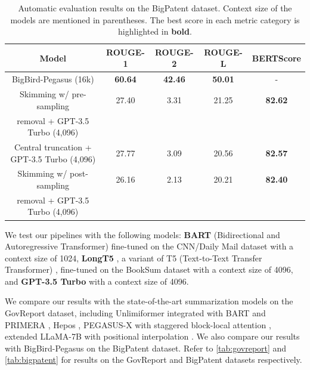 	\begin{table}[!ht]
		\centering

		\begin{tabular}{c c c c c}
			\hline
			Model & ROUGE-1 & ROUGE-2 & ROUGE-L & BERTScore \\
			\hline
			BigBird-Pegasus (16k) & \textbf{60.64} & \textbf{42.46} & \textbf{50.01} & - \\
			\hline
			Skimming w/ pre-sampling & 27.40 & 3.31 & 21.25 & \textbf{82.62} \\
			removal + GPT-3.5 Turbo (4,096) & & & & \\
			Central truncation + GPT-3.5 Turbo (4,096) & 27.77 & 3.09 & 20.56 & \textbf{82.57} \\
			Skimming w/ post-sampling & 26.16 & 2.13 & 20.21 & \textbf{82.40} \\
			removal + GPT-3.5 Turbo (4,096) & & & & \\
			\hline
		\end{tabular}

		\caption{Automatic evaluation results on the BigPatent dataset. Context size of the models are
		mentioned in parentheses. The best score in each metric category is highlighted in \textbf{bold}.}
		\label{tab:bigpatent}
	\end{table}

	We test our pipelines with the following models: \textbf{BART} (Bidirectional
	and Autoregressive Transformer) \cite{lewis-etal-2020-bart} fine-tuned on the
	CNN/Daily Mail dataset \cite{nallapati2016abstractive} with a context size of 1024,
	\textbf{LongT5} \cite{guo2021longt5}, a variant of T5 (Text-to-Text Transfer
	Transformer) \cite{raffel2020exploring}, fine-tuned on the BookSum dataset with
	a context size of 4096, and \textbf{GPT-3.5 Turbo} \cite{brown2020language} with a
	context size of 4096.

	We compare our results with the state-of-the-art summarization models on the GovReport dataset,
	including Unlimiformer \cite{bertsch2023unlimiformer} integrated with BART
	\cite{lewis-etal-2020-bart} and PRIMERA \cite{beltagy2020longformer}, Hepos
	\cite{huang-etal-2021-efficient}, PEGASUS-X with staggered block-local attention
	\cite{phang2022investigating}, extended	LLaMA-7B with positional interpolation
	\cite{chen2023extending}.
	We also compare our results with BigBird-Pegasus \cite{zaheer2020big} on the BigPatent dataset.
	Refer to \autoref{tab:govreport} and \autoref{tab:bigpatent} for results on the GovReport and 
	BigPatent datasets respectively.

